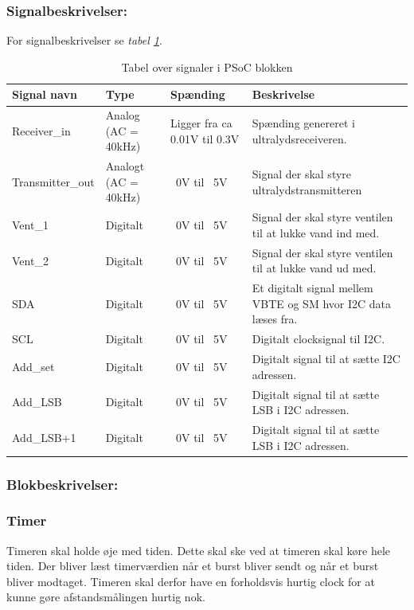 \subsubsection{Signalbeskrivelser:}
For signalbeskrivelser se \textit{tabel \ref{table:PSoCSignaler}}.
\begin{table}[H]
\begin{tabular}{|p{3cm}|p{3cm}|p{3cm}|p{4.5cm}|} \hline
\cellcolor[gray]{0.85}Signal navn& \cellcolor[gray]{0.85}Type &\cellcolor[gray]{0.85}Spænding&\cellcolor[gray]{0.85}Beskrivelse\\ \hline
Receiver\_in & Analog (AC = 40kHz) & Ligger fra ca 0.01V til 0.3V & Spænding genereret i ultralydsreceiveren.\\ \hline
Transmitter\_out & Analogt (AC = 40kHz) & ~0V til ~5V & Signal der skal styre ultralydstransmitteren \\ \hline
Vent\_1 & Digitalt & ~0V til ~5V & Signal der skal styre ventilen til at lukke vand ind med.\\ \hline
Vent\_2 & Digitalt & ~0V til ~5V & Signal der skal styre ventilen til at lukke vand ud med.\\ \hline
SDA & Digitalt & ~0V til ~5V & Et digitalt signal mellem VBTE og SM hvor I2C data læses fra.\\ \hline
SCL & Digitalt & ~0V til ~5V & Digitalt clocksignal til I2C.\\ \hline
Add\_set & Digitalt & ~0V til ~5V & Digitalt signal til at sætte I2C adressen. \\ \hline
Add\_LSB & Digitalt & ~0V til ~5V & Digitalt signal til at sætte LSB i I2C adressen. \\ \hline
Add\_LSB+1 & Digitalt & ~0V til ~5V & Digitalt signal til at sætte LSB i I2C adressen.\\ \hline
\end{tabular}
\caption{Tabel over signaler i PSoC blokken}
\label{table:PSoCSignaler}
\end{table}
\subsubsection{Blokbeskrivelser:}
\subsubsection{Timer}
Timeren skal holde øje med tiden. Dette skal ske ved at timeren skal køre hele tiden. Der bliver læst timerværdien når et burst bliver sendt og når et burst bliver modtaget. Timeren skal derfor have en forholdsvis hurtig clock for at kunne gøre afstandsmålingen hurtig nok.
